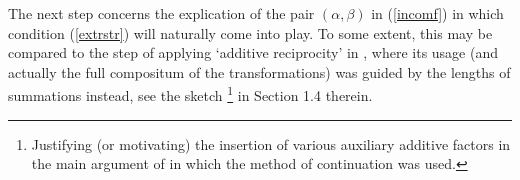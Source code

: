 \documentclass[11pt,reqno]{amsart}
\theoremstyle{definition}
\theoremstyle{definition}
\theoremstyle{remark}
\numberwithin{equation}{section}
\begin{document}
 

 

 The next step concerns the explication of  the pair  $(\alpha, \beta)$ in (\ref{incomf}) in which condition (\ref{extrstr}) will naturally come into play. To some extent, this may be compared  to  the step of applying  `additive reciprocity'   in  \cite{BHKM20}, where  its usage (and actually the full compositum of the transformations) was guided by the lengths of summations instead, see the sketch   \footnote{ Justifying (or  motivating) the insertion of various auxiliary additive factors in the main argument of \cite{BHKM20} in which the method of continuation was used.   }  in Section 1.4 therein.
 


 
\end{document}
